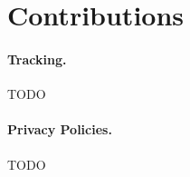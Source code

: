 \section{Contributions}
\label{sec:contrib}

\paragraph{Tracking.}

TODO

\paragraph{Privacy Policies.}

TODO

